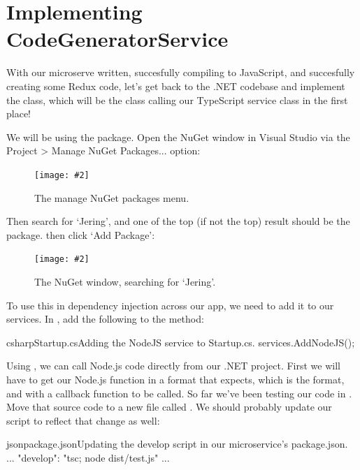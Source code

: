 \documentclass[paper=6in:9in,pagesize=pdftex,headinclude=on,footinclude=on,12pt,twoside]{scrbook}
\newcommand{\standardfigure}[3]{\begin{figure}[H]\begin{center}\texttt{[image: \#2]}\caption{#3}\label{fig:#2}\end{center}\end{figure}}
\begin{document}
\section{Implementing CodeGeneratorService}

With our microserve written, succesfully compiling to JavaScript, and succesfully creating some Redux code, let's get back to the .NET codebase and implement the  class, which will be the class calling our TypeScript service class in the first place!


We will be using the  package. Open the NuGet window in Visual Studio via the Project > Manage NuGet Packages... option:

\standardfigure{\textwidth}{backend/manage-nuget-packages}{The manage NuGet packages menu.}

Then search for `Jering', and one of the top (if not the top) result should be the  package. then click `Add Package':

\standardfigure{\textwidth}{backend/jering-package}{The NuGet window, searching for `Jering'.}

To use this in dependency injection across our app, we need to add it to our services. In , add the following to the  method:

\begin{codeInput}{csharp}{Startup.cs}{Adding the NodeJS service to Startup.cs.}
services.AddNodeJS();
\end{codeInput}

Using , we can call Node.js code directly from our .NET project. First we will have to get our Node.js function in a format that  expects, which is the  format, and with a callback function to be called. So far we've been testing our code in . Move that source code to a new file called . We should probably update our  script to reflect that change as well:

\begin{codeInput}{json}{package.json}{Updating the develop script in our microservice's package.json.}
...
"develop": "tsc; node dist/test.js"
...
\end{codeInput}
\end{document}
